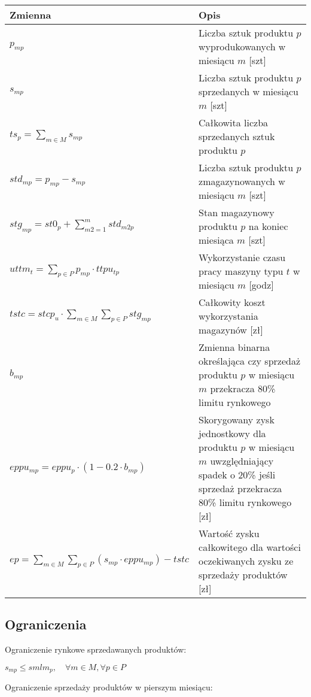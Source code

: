 \documentclass{article}
\begin{document}
\renewcommand{\arraystretch}{1.5} %
\begin{table}[H]
\centering
\begin{tabular}{|l|p{10cm}|}
\hline
Zmienna & Opis \\
\hline
$p_{mp}$ & Liczba sztuk produktu $p$ wyprodukowanych w miesiącu $m$ [szt] \\
\hline
$s_{mp}$ & Liczba sztuk produktu $p$ sprzedanych w miesiącu $m$ [szt] \\
\hline
$ts_p = \sum_{m \in M} s_{mp}$ & Całkowita liczba sprzedanych sztuk produktu $p$ \\
\hline
$std_{mp} = p_{mp} - s_{mp}$ & Liczba sztuk produktu $p$ zmagazynowanych w miesiącu $m$ [szt] \\
\hline
$stg_{mp} = st0_p + \sum\limits_{m2=1}^{m} std_{m2p}$ & Stan magazynowy produktu $p$ na koniec miesiąca $m$ [szt] \\
\hline
$uttm_t = \sum\limits_{p \in P} p_{mp} \cdot ttpu_{tp}$ & Wykorzystanie czasu pracy maszyny typu $t$ w miesiącu $m$ [godz] \\
\hline
$tstc = stcp_u \cdot \sum\limits_{m \in M} \sum\limits_{p \in P} stg_{mp}$ & Całkowity koszt wykorzystania magazynów [zł] \\
\hline
$b_{mp}$ & Zmienna binarna określająca czy sprzedaż produktu $p$ w miesiącu $m$ przekracza 80\% limitu rynkowego \\
\hline
$eppu_{mp} = eppu_p \cdot (1 - 0.2 \cdot b_{mp})$ & Skorygowany zysk jednostkowy dla produktu $p$ w miesiącu $m$ uwzględniający spadek o 20\% jeśli sprzedaż przekracza 80\% limitu rynkowego [zł] \\
\hline
$ep = \sum\limits_{m \in M} \sum\limits_{p \in P} (s_{mp} \cdot eppu_{mp}) - tstc$ & Wartość zysku całkowitego dla wartości oczekiwanych zysku ze sprzedaży produktów [zł] \\
\hline
\end{tabular}
\end{table}
\renewcommand{\arraystretch}{1} %

\subsection{Ograniczenia}

Ograniczenie rynkowe sprzedawanych produktów:

$s_{mp} \leq smlm_p, \quad \forall m \in M, \forall p \in P$

Ograniczenie sprzedaży produktów w pierszym miesiącu:
\end{document}
